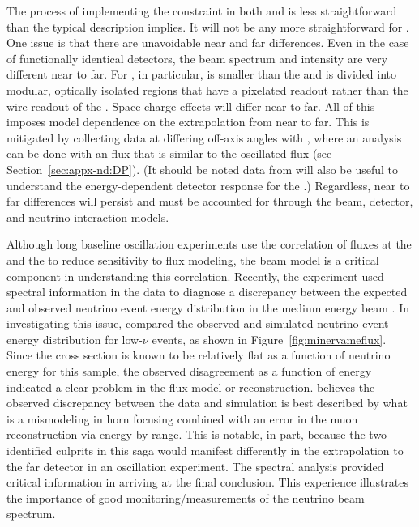 The process of implementing the   constraint in both  and    is less straightforward than the typical description implies.  It will not be any more straightforward for .  One issue is that there are unavoidable near and far differences. Even in the case of functionally identical detectors, the beam spectrum and intensity are very different near to far.  For , in particular, 
 is smaller than the  and is divided into modular, optically isolated regions that have a pixelated readout rather than the wire readout of the .  Space charge effects will differ near to far.  All of this imposes model dependence on the extrapolation from near to far.  This is mitigated by collecting data at differing off-axis angles with , where an analysis can be done with an  flux that is similar to the oscillated  flux (see Section~\ref{sec:appx-nd:DP}). (It should be noted data from  will also be useful to understand the energy-dependent detector response for the .)  Regardless, near to far differences will persist and must be accounted for through the beam, detector, and neutrino interaction models.  

Although long baseline oscillation experiments use the correlation of fluxes at the  and the  to reduce sensitivity to flux modeling, the beam model is a critical component in understanding this correlation.  Recently, the  experiment used spectral information in the data to diagnose a discrepancy between the expected and observed neutrino event energy distribution in the  medium energy beam \cite{JenaNUINT2018}. In investigating this issue,  compared the observed and simulated neutrino event energy distribution for low-$\nu$ events, as shown in Figure~\ref{fig:minervameflux}.  Since the cross section is known to be relatively flat as a function of neutrino energy for this sample, the observed disagreement as a function of energy indicated a clear problem in the flux model or reconstruction.      
 believes the observed discrepancy between the data and simulation is best described by what is a mismodeling in horn focusing combined with an error in the muon reconstruction via energy by range.  This is notable, in part, because the two identified culprits in this saga would manifest differently in the extrapolation to the far detector in an oscillation experiment. The spectral analysis provided critical information in arriving at the final conclusion.  This experience illustrates the importance of good monitoring/measurements of the neutrino beam spectrum.  

